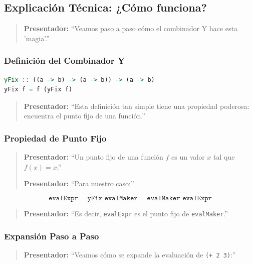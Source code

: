 \documentclass[12pt]{article}
\begin{document}
\newpage
\subsection*{Explicación Técnica: ¿Cómo funciona?}

\begin{quote}
\textbf{Presentador:} ``Veamos paso a paso cómo el combinador Y hace esta 'magia'.''
\end{quote}

\subsubsection*{Definición del Combinador Y}

\begin{lstlisting}[language=Haskell]
yFix :: ((a -> b) -> (a -> b)) -> (a -> b)
yFix f = f (yFix f)
\end{lstlisting}

\begin{quote}
\textbf{Presentador:} ``Esta definición tan simple tiene una propiedad poderosa: encuentra el punto fijo de una función.''
\end{quote}

\subsubsection*{Propiedad de Punto Fijo}

\begin{quote}
\textbf{Presentador:} ``Un punto fijo de una función $f$ es un valor $x$ tal que $f(x) = x$.''

\textbf{Presentador:} ``Para nuestro caso:''
\end{quote}

\begin{equation*}
\texttt{evalExpr} = \texttt{yFix evalMaker} = \texttt{evalMaker evalExpr}
\end{equation*}

\begin{quote}
\textbf{Presentador:} ``Es decir, \texttt{evalExpr} es el punto fijo de \texttt{evalMaker}.''
\end{quote}

\subsubsection*{Expansión Paso a Paso}

\begin{quote}
\textbf{Presentador:} ``Veamos cómo se expande la evaluación de \texttt{(+ 2 3)}:''
\end{quote}
\end{document}
